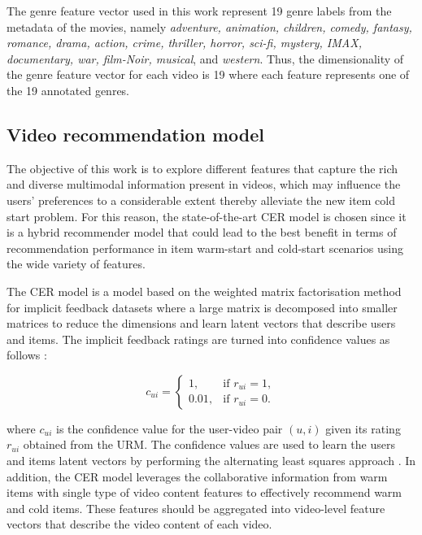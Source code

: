 \documentclass[review]{elsarticle}
\begin{document}
The genre feature vector used in this work represent 19 genre labels from the metadata of the movies, namely \textit{adventure, animation, children, comedy, fantasy, romance, drama, action, crime, thriller, horror, sci-fi, mystery, IMAX, documentary, war, film-Noir, musical}, and \textit{western}. Thus, the dimensionality of the genre feature vector for each video is 19 where each feature represents one of the 19 annotated genres.     


\subsection{Video recommendation model}
The objective of this work is to explore different features that capture the rich and diverse multimodal information present in videos, which may influence the users’ preferences to a considerable extent \citep{deldjoo2020recommender} thereby alleviate the new item cold start problem. For this reason, the state-of-the-art \ac{CER} model \citep{du2018personalized} is chosen since it is a hybrid recommender model that could lead to the best benefit in terms of recommendation performance in item warm-start and cold-start scenarios using the wide variety of features. 

The \ac{CER} model is a model based on the weighted matrix factorisation method for implicit feedback datasets where a large matrix is decomposed into smaller matrices to reduce the dimensions and learn latent vectors that describe users and items. The implicit feedback ratings are turned into confidence values as follows \citep{du2018personalized}:

\begin{equation}
    c_{ui} = \begin{cases}
    1, & \text{if $r_{ui} = 1$},\\
    0.01, & \text{if $r_{ui} = 0$}.
  \end{cases}
\end{equation}


\noindent where $c_{ui}$ is the confidence value for the user-video pair $(u,i)$ given its rating $r_{ui}$ obtained from the \ac{URM}. The confidence values are used to learn the users and items latent vectors by performing the alternating least squares approach \citep{du2018personalized}. In addition, the CER model leverages the collaborative information from warm items with single type of video content features to effectively recommend warm and cold items. These features should be aggregated into video-level feature vectors that describe the video content of each video. 
\end{document}
